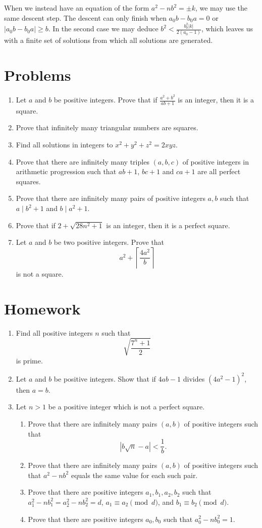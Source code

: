 \documentclass{article}
\begin{document}
When we instead have an equation of the form $a^2-nb^2=\pm k$, we may use the
same descent step. The descent
can only finish when $a_0 b-b_0 a=0$ or $|a_0 b-b_0 a|\ge b$. In the second case
we may deduce
$b^2<\frac{b_0^2|k|}{2(a_0-1)}$,
which leaves us with a finite set of solutions from which all solutions are
generated.
\newpage
\section{Problems}
\begin{enumerate}
	\item Let $a$ and $b$ be positive integers.
	      Prove that if \(\frac{a^2+b^2}{ab+1}\) is an integer, then it is a square.
	\item Prove that infinitely many triangular numbers are squares.
	\item Find all solutions in integers to $x^2+y^2+z^2=2xyz$.
	\item Prove that there are infinitely many triples $(a,b,c)$ of positive
	      integers in arithmetic progression
	      such that $ab+1$, $bc+1$ and $ca+1$ are all perfect squares.
	\item Prove that there are infinitely many pairs of positive integers $a,b$
	      such that $a\mid b^2+1$ and $b\mid a^2+1$.
	\item Prove that if $2+\sqrt{28n^2+1}$ is an integer, then it is a perfect
	      square.
	\item Let $a$ and $b$ be two positive integers. Prove that
	      \[a^2+\left\lceil\frac{4a^2}b\right\rceil\] is not a square.
\end{enumerate}
\newpage
\section{Homework}
\begin{enumerate}
	\item Find all positive integers $n$ such that \[\sqrt{\frac{7^n+1}2}\] is
	      prime.
	\item Let $a$ and $b$ be positive integers. Show that if $4ab-1$ divides
	      $(4a^2-1)^2$, then $a=b$.
	\item Let $n>1$ be a positive integer which is not a perfect square.
	      \begin{enumerate}
		      \item Prove that there are infinitely many pairs $(a,b)$ of positive
		            integers such that
		            \[\left|b\sqrt n-a\right|<\frac 1b.\]
		      \item Prove that there are infinitely many pairs $(a,b)$ of positive
		            integers such that $a^2-nb^2$ equals the same value for each such pair.
		      \item Prove that there are positive integers $a_1,b_1,a_2,b_2$
		            such that $a_1^2-nb_1^2=a_2^2-nb_2^2=d$, $a_1\equiv a_2\pmod d$, and
		            $b_1\equiv b_2\pmod d$.
		      \item Prove that there are positive integers $a_0,b_0$ such that
		            $a_0^2-nb_0^2=1$.
	      \end{enumerate}
\end{enumerate}
\end{document}
